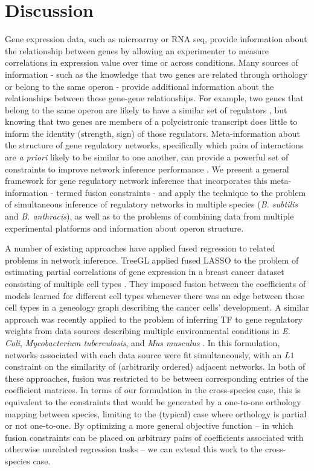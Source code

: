 \documentclass[11pt]{article}
\begin{document}
\section{Discussion}
Gene expression data, such as microarray or RNA seq, provide information about the relationship between genes by allowing an experimenter to measure correlations in expression value over time or across conditions. Many sources of information - such as the knowledge that two genes are related through orthology or belong to the same operon - provide additional information about the relationships between these gene-gene relationships. 
For example,  two genes that belong to the same operon are likely to have a similar set of regulators \cite{lawrence_shared_2002}, but knowing that two genes are members of a polycistronic transcript does little to inform the identity (strength, sign) of those regulators. 
Meta-information about the structure of gene regulatory networks, specifically which pairs of interactions are \textit{a priori} likely to be similar to one another, can provide a powerful set of constraints to improve network inference performance \cite{roy_arboretum:_2013, pierson_sharing_2015}. 
We present a general framework for gene regulatory network inference that incorporates this meta-information - termed fusion constraints - and apply the technique to the problem of simultaneous inference of regulatory networks in multiple species (\textit{B. subtilis} and \textit{B. anthracis}), as well as to the problems of combining data from multiple experimental platforms and information about operon structure.

A number of existing approaches have applied fused regression to related problems in network inference. TreeGL applied fused LASSO to the problem of estimating partial correlations of gene expression in a breast cancer dataset consisting of multiple cell types \cite{parikh2011treegl}. They imposed fusion between the coefficients of models learned for different cell types whenever there was an edge between those cell types in a geneology graph describing the cancer cells' development. A similar approach was recently applied to the problem of inferring TF to gene regulatory weights from data sources describing multiple environmental conditions in \textit{E. Coli}, \textit{Mycobacterium tuberculosis}, and \textit{Mus musculus} \cite{omranian2016gene}. In this formulation, networks associated with each data source were fit simultaneously, with an $L1$ constraint on the similarity of (arbitrarily ordered) adjacent networks. In both of these approaches, fusion was restricted to be between corresponding entries of the coefficient matrices. In terms of our formulation in the cross-species case, this is equivalent to the constraints that would be generated by a one-to-one orthology mapping between species, limiting to the (typical) case where orthology is partial or not one-to-one. By optimizing a more general objective function -- in which fusion constraints can be placed on arbitrary pairs of coefficients associated with otherwise unrelated regression tasks -- we can extend this work to the cross-species case.
\end{document}
